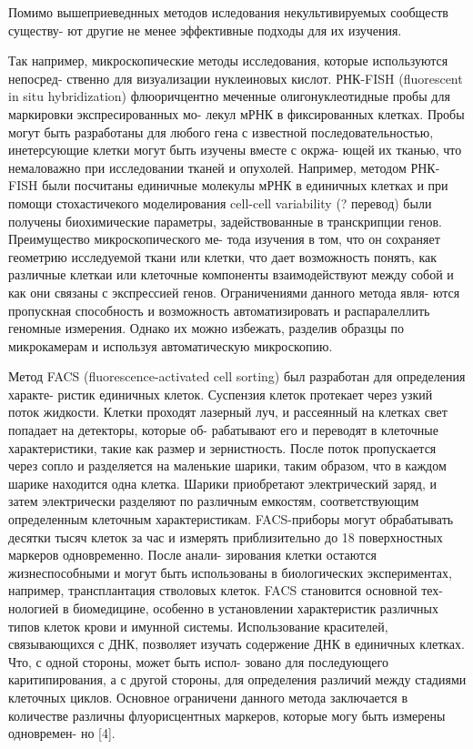 Помимо вышеприеведнных методов иследования некультивируемых сообществ существу-
ют другие не менее эффективные подходы для их изучения.

Так например, микроскопические методы исследования, которые используются непосред-
ственно для визуализации нуклеиновых кислот. РНК-FISH (fluorescent in situ hybridization)
флюоричцентно меченные олигонуклеотидные пробы для маркировки экспресированных мо-
лекул мРНК в фиксированных клетках. Пробы могут быть разработаны для любого гена с
известной последовательностью, инетерсующие клетки могут быть изучены вместе с окржа-
ющей их тканью, что немаловажно при исследовании тканей и опухолей. Например, методом
РНК-FISH были посчитаны единичные молекулы мРНК в единичных клетках и при помощи
стохастичекого моделирования cell-cell variability (? перевод) были получены биохимические
параметры, задействованные в транскрипции генов. Преимущество микроскопического ме-
тода изучения в том, что он сохраняет геометрию исследуемой ткани или клетки, что дает
возможность понять, как различные клеткаи или клеточные компоненты взаимодействуют
между собой и как они связаны с экспрессией генов. Ограничениями данного метода явля-
ются пропускная способность и возможность автоматизировать и распаралеллить геномные
измерения. Однако их можно избежать, разделив образцы по микрокамерам и используя
автоматическую микроскопию.

Метод FACS (fluorescence-activated cell sorting) был разработан для определения характе-
ристик единичных клеток. Суспензия клеток протекает через узкий поток жидкости. Клетки
проходят лазерный луч, и рассеянный на клетках свет попадает на детекторы, которые об-
рабатывают его и переводят в клеточные характеристики, такие как размер и зернистность.
После поток пропускается через сопло и разделяется на маленькие шарики, таким образом,
что в каждом шарике находится одна клетка. Шарики приобретают электрический заряд,
и затем электрически разделяют по различным емкостям, соответствующим определенным
клеточным характеристикам. FACS-приборы могут обрабатывать десятки тысяч клеток за
час и измерять приблизительно до 18 поверхностных маркеров одновременно. После анали-
зирования клетки остаются жизнеспособными и могут быть использованы в биологических
экспериментах, например, трансплантация стволовых клеток. FACS становится основной тех-
нологией в биомедицине, особенно в установлении характеристик различных типов клеток
крови и имунной системы. Использование красителей, связывающихся с ДНК, позволяет
изучать содержение ДНК в единичных клетках. Что, с одной стороны, может быть испол-
зовано для последующего каритипирования, а с другой стороны, для определения различий
между стадиями клеточных циклов. Основное ограничени данного метода заключается в
количестве различны флуорисцентных маркеров, которые могу быть измерены одновремен-
но [4].

